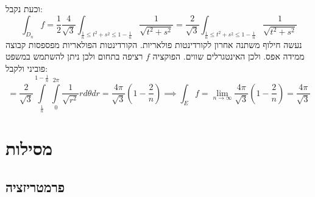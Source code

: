 \documentclass{tstextbook}
\begin{document}
וכעת נקבל:
$$\int_{D_{n}}f={\frac{1}{2}}{\frac{4}{\sqrt{3}}}\int_{{\frac{1}{n}}\leq t^{2}+s^{2}\leq1-{\frac{1}{n}}}{\frac{1}{\sqrt{t^{2}+s^{2}}}}={\frac{2}{\sqrt{3}}}\int_{{\frac{1}{n}}\leq t^{2}+s^{2}\leq1-{\frac{1}{n}}}{\frac{1}{\sqrt{t^{2}+s^{2}}}}$$
נעשה חילוף משתנה אחרון לקורדינטות פולאריות. הקורדינטות הפולאריות מפספסות קבוצה ממידה אפס. ולכן האינטגרלים שווים. הפוקציה \(f\) רציפה בתחום ולכן ניתן להשתמש במשפט פוביני ולקבל:
$$=\frac{2}{\sqrt{3}}\int\limits_{\frac{1}{n}}^{1-\frac{1}{n}}\int\limits_{0}^{2\pi}\frac{1}{\sqrt{r^{2}}}r d\theta d r=\frac{4\pi}{\sqrt{3}}\left( 1-\frac{2}{n} \right)\implies\int_{E}f=\operatorname*{lim}_{n\to\infty}{\frac{4\pi}{\sqrt{3}}}\left( 1-{\frac{2}{n}} \right)={\frac{4\pi}{\sqrt{3}}}$$

\chapter{מסילות}

\section{פרמטריזציה}
\end{document}
